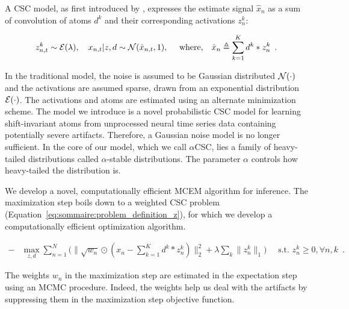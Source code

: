 A \ac{CSC} model, as first introduced by \citep{grosse2012shift}, expresses the estimate signal $\hat{x}_n$ as a sum of convolution of atoms $d^k$ and their corresponding activations $z_n^k$:

\begin{align}
z_{n,t}^k \sim {\cal E}(\lambda),
\quad x_{n,t} | z, d \sim {\cal N}( \hat{x}_{n,t},1 ),
\quad \text{ where,}
\quad \hat{x}_n \triangleq \sum_{k=1}^{K}d^{k} * z_{n}^{k} \enspace .
\label{eqn:sommaire:csc_prob}
\end{align}

In the traditional model, the noise is assumed to be Gaussian distributed $\cal N(\cdot)$ and the activations are assumed sparse, drawn from an exponential distribution $\cal E(\cdot)$. The activations and atoms are estimated using an alternate minimization scheme. The model we introduce is a novel probabilistic \ac{CSC} model for learning shift-invariant atoms from unprocessed neural time series data containing potentially severe artifacts. Therefore, a Gaussian noise model is no longer sufficient. In the core of our model, which we call $\alpha$CSC, lies a family of heavy-tailed
distributions called $\alpha$-stable distributions. The parameter $\alpha$ controls how heavy-tailed the distribution is.

We develop a novel, computationally efficient \ac{MCEM} algorithm for inference. The maximization step boils down to a weighted
\ac{CSC} problem (Equation~\ref{eq:sommaire:problem_definition_z}), for which we develop a computationally efficient optimization algorithm.

\begin{align}
- & \max_{z, d} \sum_{n=1}^{N} \Big( \|\sqrt{w_{n}} \odot (x_{n} - \sum_{k=1}^{K}d^{k} * z_{n}^{k})\|_{2}^{2} + \lambda \sum_{k}{ \|{z}_{n}^{k} \|_1}\Big) \quad \text{ s.t.  } {z}_n^k \geq 0, \forall n,k\enspace .
\label{eq:sommaire:problem_definition_z}
\end{align} 

The weights $w_n$ in the maximization step are estimated in the expectation step using an \ac{MCMC} procedure. Indeed, the weights help us deal with the artifacts by suppressing them in the maximization step objective function.

